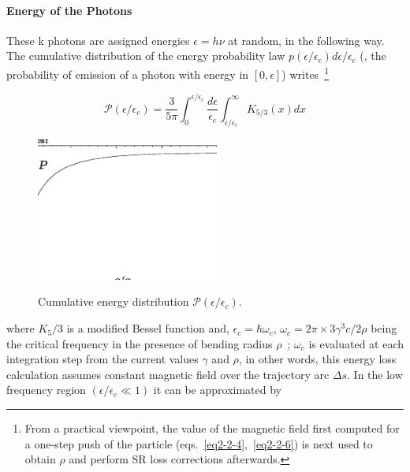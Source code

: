 \paragraph{Energy of the Photons}

These k photons are assigned energies $\epsilon=h\nu$ at random, in the following way. The cumulative 
distribution of the energy probability law $p(\epsilon/\epsilon_c)d\epsilon/\epsilon_c$  
(\ie, the probability of emission of a photon with  energy in  $[0,\epsilon]$) writes~\footnote{From 
a practical viewpoint, the value of the magnetic field first computed for a 
one-step push of the particle  (eqs.~\ref{eq2-2-4},~\ref{eq2-2-6}) is next used to  obtain  
$\rho$ and perform SR loss corrections afterwards.} 

\begin{equation}
\label{EqSK53}
 \mathcal{P}(\epsilon/\epsilon_c) = \dfrac{3}{5\pi} \int_0^{\epsilon/\epsilon_c} \dfrac{d\epsilon}{\epsilon_c} \int_{\epsilon/\epsilon_c}^\infty K_{5/3}(x) dx
\end{equation}
%
\begin{figure}
  \begin{center} 
\vspace{-2mm}
\includegraphics*[bbllx=20,bblly=100,bburx=550,bbury=450,width=6cm]{G.eps}
\vspace{-0mm}

 {\small \centering 
       Cumulative energy distribution   $\mathcal{P}(\epsilon/\epsilon_c)$. }
  \end{center}
\end{figure}
where $K_5/3$ is a modified Bessel function and, $\epsilon_c= \hbar \omega_c$, 
$\omega_c=2 \pi \times 3 \gamma^3 c / 2 \rho$ being the critical frequency  in 
the presence of bending radius $\rho$~;  $\omega_c$ is evaluated at each integration step from 
the current values $\gamma$ and $\rho$, in other words, this energy loss calculation 
assumes constant  magnetic field  over the trajectory arc $\Delta s$. 
In the low frequency region $(\epsilon/\epsilon_c \ll 1)$ it can be approximated by 

